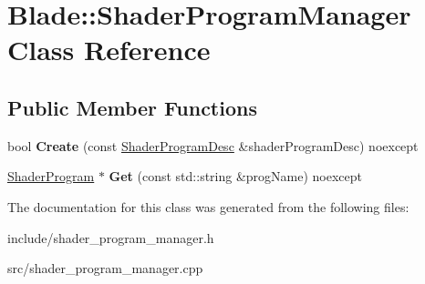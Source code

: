 \hypertarget{class_blade_1_1_shader_program_manager}{}\section{Blade\+:\+:Shader\+Program\+Manager Class Reference}
\label{class_blade_1_1_shader_program_manager}
\subsection*{Public Member Functions}
\begin{DoxyCompactItemize}
\item 
\mbox{\label{class_blade_1_1_shader_program_manager_a8273a7106a27e3a75169fba65ac3902e}} 
bool {\bfseries Create} (const \hyperlink{struct_blade_1_1_shader_program_desc}{Shader\+Program\+Desc} \&shader\+Program\+Desc) noexcept
\item 
\mbox{\label{class_blade_1_1_shader_program_manager_a5e9744ef91a953b1ca5cc38160568804}} 
\hyperlink{class_blade_1_1_shader_program}{Shader\+Program} $\ast$ {\bfseries Get} (const std\+::string \&prog\+Name) noexcept
\end{DoxyCompactItemize}


The documentation for this class was generated from the following files\+:\begin{DoxyCompactItemize}
\item 
include/shader\+\_\+program\+\_\+manager.\+h\item 
src/shader\+\_\+program\+\_\+manager.\+cpp\end{DoxyCompactItemize}
